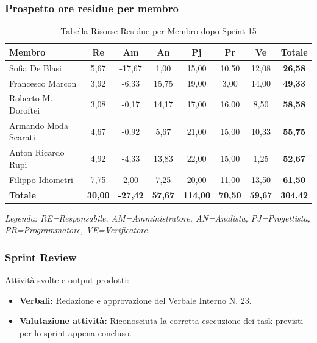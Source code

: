 \subsubsection{Prospetto ore residue per membro}
\begin{table}[H]
    \centering
    \renewcommand{\arraystretch}{1.3}
    \begin{tabularx}{\textwidth}{|X|c|c|c|c|c|c|c|}
        \hline
        \textbf{Membro} & \textbf{Re} & \textbf{Am} & \textbf{An} &
        \textbf{Pj} & \textbf{Pr} & \textbf{Ve} & \textbf{Totale} \\
        \hline
        Sofia De Blasi       &  5,67 & -17,67 &  1,00 & 15,00 & 10,50 & 12,08 & \textbf{26,58} \\
        Francesco Marcon     &  3,92 &  -6,33 & 15,75 & 19,00 &  3,00 & 14,00 & \textbf{49,33} \\
        Roberto M. Doroftei  &  3,08 &  -0,17 & 14,17 & 17,00 & 16,00 &  8,50 & \textbf{58,58} \\
        Armando Moda Scarati &  4,67 &  -0,92 &  5,67 & 21,00 & 15,00 & 10,33 & \textbf{55,75} \\
        Anton Ricardo Rupi   &  4,92 &  -4,33 & 13,83 & 22,00 & 15,00 &  1,25 & \textbf{52,67} \\
        Filippo Idiometri    &  7,75 &   2,00 &  7,25 & 20,00 & 11,00 & 13,50 & \textbf{61,50} \\
        \hline
        \textbf{Totale} &
        \textbf{30,00} & \textbf{-27,42} & \textbf{57,67} &
        \textbf{114,00} & \textbf{70,50} & \textbf{59,67} &
        \textbf{304,42} \\
        \hline
    \end{tabularx}
    \begin{minipage}{\textwidth}
        \smallskip
        \footnotesize\textit{Legenda: RE=Responsabile, AM=Amministratore,
        AN=Analista, PJ=Progettista, PR=Programmatore, VE=Verificatore.}
    \end{minipage}
    \caption{Tabella Risorse Residue per Membro dopo Sprint 15}
\end{table}

\subsubsection{Sprint Review}
Attività svolte e output prodotti:
\begin{itemize}
    \item \textbf{Verbali:} Redazione e approvazione del Verbale Interno N. 23.
    \item \textbf{Valutazione attività:} Riconosciuta la corretta esecuzione dei task previsti per lo sprint appena concluso.
\end{itemize}

